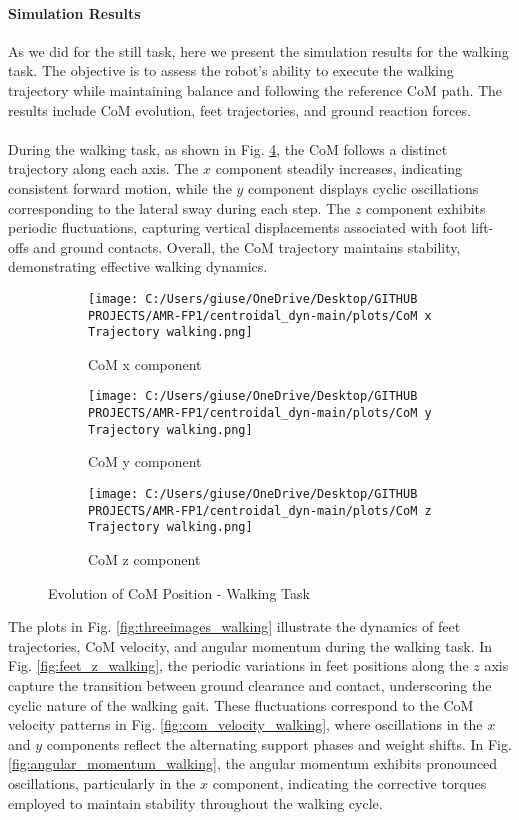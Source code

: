 \documentclass[main.tex]{subfiles}
\begin{document}
\begin{sloppypar}
\paragraph{Simulation Results}
As we did for the still task, here we present the simulation results for the walking task. The objective is to assess the robot’s ability to execute the walking trajectory while maintaining balance and following the reference CoM path. The results include CoM evolution, feet trajectories, and ground reaction forces. \\ 
\\
During the walking task, as shown in Fig. \ref{fig:com_walking}, the CoM follows a distinct trajectory along each axis. The \( x \) component steadily increases, indicating consistent forward motion, while the \( y \) component displays cyclic oscillations corresponding to the lateral sway during each step. The \( z \) component exhibits periodic fluctuations, capturing vertical displacements associated with foot lift-offs and ground contacts. Overall, the CoM trajectory maintains stability, demonstrating effective walking dynamics.
\begin{figure}[H]
    \centering
    \begin{subfigure}[b]{0.32\textwidth}
        \centering
        \texttt{[image: C:/Users/giuse/OneDrive/Desktop/GITHUB PROJECTS/AMR-FP1/centroidal\_dyn-main/plots/CoM x Trajectory walking.png]}
        \caption{CoM x component}
        \label{fig:com_x_walking}
    \end{subfigure}
    \hfill
    \begin{subfigure}[b]{0.32\textwidth}
        \centering
        \texttt{[image: C:/Users/giuse/OneDrive/Desktop/GITHUB PROJECTS/AMR-FP1/centroidal\_dyn-main/plots/CoM y Trajectory walking.png]}
        \caption{CoM y component}
        \label{fig:com_y_walking}
    \end{subfigure}
    \hfill
    \begin{subfigure}[b]{0.32\textwidth}
        \centering
        \texttt{[image: C:/Users/giuse/OneDrive/Desktop/GITHUB PROJECTS/AMR-FP1/centroidal\_dyn-main/plots/CoM z Trajectory walking.png]}
        \caption{CoM z component}
        \label{fig:com_z_walking}
    \end{subfigure}
    \caption{Evolution of CoM Position - Walking Task}
    \label{fig:com_walking}
\end{figure}
The plots in Fig. \ref{fig:threeimages_walking} illustrate the dynamics of feet trajectories, CoM velocity, and angular momentum during the walking task. In Fig. \ref{fig:feet_z_walking}, the periodic variations in feet positions along the $z$ axis capture the transition between ground clearance and contact, underscoring the cyclic nature of the walking gait. These fluctuations correspond to the CoM velocity patterns in Fig. \ref{fig:com_velocity_walking}, where oscillations in the $x$ and $y$ components reflect the alternating support phases and weight shifts. In Fig. \ref{fig:angular_momentum_walking}, the angular momentum exhibits pronounced oscillations, particularly in the $x$ component, indicating the corrective torques employed to maintain stability throughout the walking cycle.

\end{sloppypar}
\end{document}
